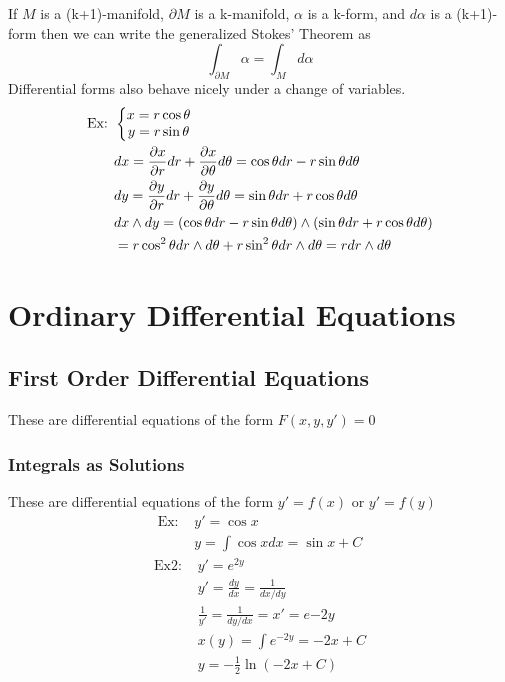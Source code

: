 \documentclass[11pt, fleqn]{article}
\begin{document}
If $M$ is a (k+1)-manifold, $\partial M$ is a k-manifold, $\alpha$ is a k-form, and $d\alpha$ is a (k+1)-form then we can write the generalized Stokes' Theorem as
$$\int_{\partial M}\alpha=\int_M d\alpha$$
Differential forms also behave nicely under a change of variables.
\begin{align*}
    \text{Ex: }&\left\{\begin{matrix} x=r\cos\theta\\y=r\sin\theta \end{matrix}\right.\\
    &dx=\frac{\partial x}{\partial r}dr+\frac{\partial x}{\partial \theta}d\theta=\cos\theta dr-r\sin\theta d\theta\\
    &dy=\frac{\partial y}{\partial r}dr+\frac{\partial y}{\partial\theta}d\theta=\sin\theta dr+r\cos\theta d\theta\\
    &dx\wedge dy=(\cos\theta dr-r\sin\theta d\theta)\wedge(\sin\theta dr+r\cos\theta d\theta)\\
    &=r\cos^2\theta dr\wedge d\theta+r\sin^2\theta dr\wedge d\theta=rdr\wedge d\theta
\end{align*}







































\section{Ordinary Differential Equations}
\subsection{First Order Differential Equations}
These are differential equations of the form $F(x,y,y')=0$
\subsubsection{Integrals as Solutions}
These are differential equations of the form $y'=f(x)$ or $y'=f(y)$\\
\begin{align*}
    \text{Ex: }&y'=\cos x\\
    &y=\int\cos xdx=\sin x+C
\end{align*}
\begin{align*}
    \text{Ex2: }&y'=e^{2y}\\
    &y'=\frac{dy}{dx}=\frac{1}{dx/dy}\\
    &\frac{1}{y'}=\frac{1}{dy/dx}=x'=e{-2y}\\
    &x(y)=\int e^{-2y}=-2x+C\\
    &y=-\frac{1}{2}\ln(-2x+C)
\end{align*}
\end{document}
